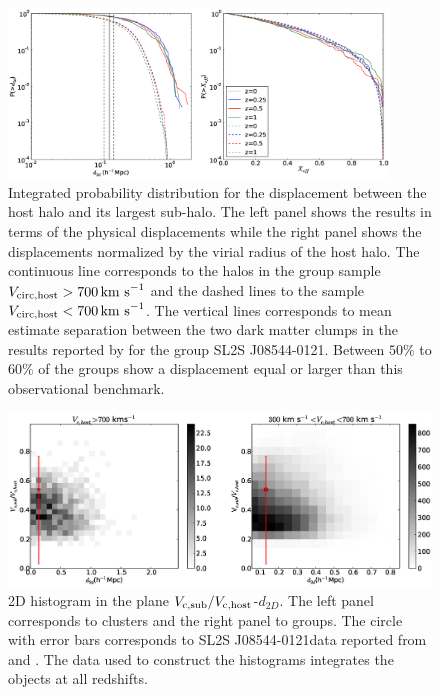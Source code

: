 \documentclass{emulateapj}
\newcommand{\kms}{{\ifmmode{{\mathrm{\,km\ s}^{-1}}}\else{\,km~s$^{-1}$}\fi}}
\newcommand{\bullg}{SL2S J08544-0121}
\begin{document}
\begin{figure}
\begin{center}
\includegraphics[width=0.9\textwidth]{figure_1.eps}
\end{center}
\caption{
  Integrated probability distribution for the displacement
  between the host halo and its largest sub-halo. The left panel
  shows the results in terms of the physical displacements while
  the right panel shows the displacements normalized by the virial radius of
  the host halo. The continuous line corresponds to the halos in the
  group sample $V_{\rm circ,host}>700\kms$ and the dashed lines to the
  sample $V_{\rm circ,host}<700\kms$.
  The vertical lines corresponds to mean estimate separation 
  between the two dark matter clumps in the results reported by
  \citet{Gastaldello} for the group SL2S J08544-0121. Between $50\%$
  to $60\%$ of the groups show a displacement equal or larger than
  this observational benchmark.}
\label{fig:displacement}
\end{figure}

\begin{figure}
\begin{center}
\includegraphics[width=1.0\textwidth]{figure_2.eps} 
\end{center}
\caption{2D histogram in the plane $V_{\rm c,sub}/V_{\rm
    c,host}$-$d_{2D}$. The left panel corresponds to clusters and the
  right panel to groups. The circle with error bars corresponds to
  \bullg data reported from \citet{2013A&A...552A..80M} and
  \citet{Gastaldello}. The data used to construct the histograms
  integrates the objects at all redshifts. }
\label{fig:mass_displacement}
\end{figure}
\end{document}

